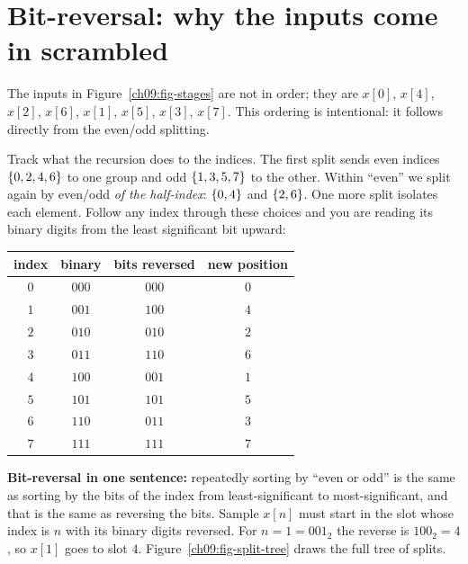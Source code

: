 \section{Bit-reversal: why the inputs come in scrambled}
\label{ch09:bitreversal}

The inputs in Figure~\ref{ch09:fig-stages} are not in order; they
are $x[0]$, $x[4]$, $x[2]$, $x[6]$, $x[1]$, $x[5]$, $x[3]$, $x[7]$. This ordering is
intentional: it follows directly from the even/odd splitting.

Track what the recursion does to the indices. The first split sends even indices
$\{0,2,4,6\}$ to one group and odd $\{1,3,5,7\}$ to the other. Within ``even'' we
split again by even/odd \emph{of the half-index}: $\{0,4\}$ and $\{2,6\}$. One more
split isolates each element. Follow any index through these choices and you are reading
its binary digits from the least significant bit upward:

\begin{center}
\begin{tabular}{c c c c}
\toprule
index & binary & bits reversed & new position \\
\midrule
$0$ & $000$ & $000$ & $0$ \\
$1$ & $001$ & $100$ & $4$ \\
$2$ & $010$ & $010$ & $2$ \\
$3$ & $011$ & $110$ & $6$ \\
$4$ & $100$ & $001$ & $1$ \\
$5$ & $101$ & $101$ & $5$ \\
$6$ & $110$ & $011$ & $3$ \\
$7$ & $111$ & $111$ & $7$ \\
\bottomrule
\end{tabular}
\end{center}

\begin{happeningbox}
\textbf{Bit-reversal in one sentence:} repeatedly sorting by ``even or odd'' is the same
as sorting by the bits of the index from least-significant to most-significant, and that
is the same as reversing the bits. Sample $x[n]$ must start in the slot whose index is
$n$ with its binary digits reversed. For $n=1=001_2$ the reverse is $100_2 = 4$, so
$x[1]$ goes to slot $4$. Figure~\ref{ch09:fig-split-tree} draws the full tree of splits.
\end{happeningbox}

